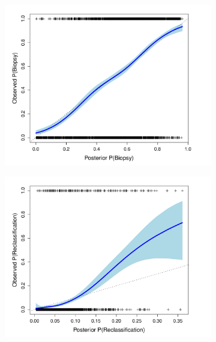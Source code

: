 \documentclass[12pt, letterpaper]{article}
\begin{document}
\begin{figure}
\begin{center}
\begin{subfigure}[b]{0.5\textwidth}
\includegraphics[width=\textwidth]{pred-vs-obs-bx.pdf}
\end{subfigure}
\begin{subfigure}[b]{0.5\textwidth}
\includegraphics[width=\textwidth]{pred-vs-obs-rc.pdf}
\end{subfigure}
\begin{subfigure}[b]{0.5\textwidth}

\end{subfigure}
\end{center}
\end{figure}
\end{document}

